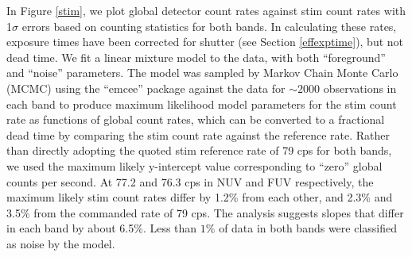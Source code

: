 \documentclass[preprint]{aastex}
\begin{document}
In Figure \ref{stim}, we plot global detector count rates against stim count rates with 1$\sigma$ errors based on counting statistics for both bands. In calculating these rates, exposure times have been corrected for shutter (see Section \ref{effexptime}), but not dead time. We fit a linear mixture model to the data, with both ``foreground'' and ``noise'' parameters. The model was sampled by Markov Chain Monte Carlo (MCMC) using the ``emcee'' package \citep{for2013} against the data for $\sim 2000$ observations in each band to produce maximum likelihood model parameters for the stim count rate as functions of global count rates, which can be converted to a fractional dead time by comparing the stim count rate against the reference rate. Rather than directly adopting the quoted stim reference rate of 79 cps for both bands, we used the maximum likely y-intercept value corresponding to ``zero'' global counts per second. At 77.2 and 76.3 cps in NUV and FUV respectively, the maximum likely stim count rates differ by 1.2\% from each other, and 2.3\% and 3.5\% from the commanded rate of 79 cps. The analysis suggests slopes that differ in each band by about 6.5\%. Less than $1\%$ of data in both bands were classified as noise by the model.
\end{document}
